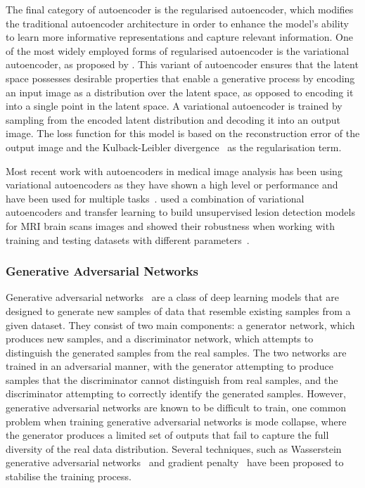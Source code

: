 The final category of autoencoder is the regularised autoencoder, which modifies the traditional autoencoder architecture in order to enhance the model's ability to learn more informative representations and capture relevant information. One of the most widely employed forms of regularised autoencoder is the variational autoencoder, as proposed by \cite{kingma2013auto}. This variant of autoencoder ensures that the latent space possesses desirable properties that enable a generative process by encoding an input image as a distribution over the latent space, as opposed to encoding it into a single point in the latent space. A variational autoencoder is trained by sampling from the encoded latent distribution and decoding it into an output image. The loss function for this model is based on the reconstruction error of the output image and the Kulback-Leibler divergence~\citep{kullback1951information} as the regularisation term.

Most recent work with autoencoders in medical image analysis has been using variational autoencoders as they have shown a high level or performance and have been used for multiple tasks~\citep{wei2020recent}. \cite{akrami2020brain} used a combination of variational autoencoders and transfer learning to build unsupervised lesion detection models for MRI brain scans images and showed their robustness when working with training and testing datasets with different parameters~\citep{thiagarajan2020improving}. 

\subsubsection{Generative Adversarial Networks}
\label{subsubsec:generative_adversarial_networks}
Generative adversarial networks~\citep{goodfellow2014generative} are a class of deep learning models that are designed to generate new samples of data that resemble existing samples from a given dataset. They consist of two main components: a generator network, which produces new samples, and a discriminator network, which attempts to distinguish the generated samples from the real samples. The two networks are trained in an adversarial manner, with the generator attempting to produce samples that the discriminator cannot distinguish from real samples, and the discriminator attempting to correctly identify the generated samples. However, generative adversarial networks are known to be difficult to train, one common problem when training generative adversarial networks is mode collapse, where the generator produces a limited set of outputs that fail to capture the full diversity of the real data distribution. Several techniques, such as Wasserstein generative adversarial networks~\citep{arjovsky2017wasserstein} and gradient penalty~\citep{gulrajani2017improved} have been proposed to stabilise the training process.

